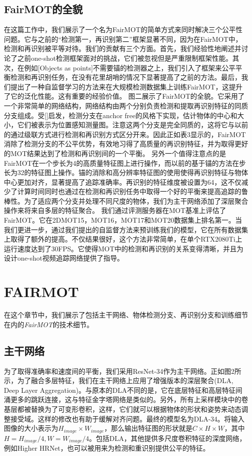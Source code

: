 \documentclass{ctexart}
\begin{document}
\subsection{FairMOT的全貌}
在这篇工作中，我们展示了一个名为FairMOT的简单方式来同时解决三个公平性问题。它与之前的“检测第一，再识别第二”框架显著不同，因为在FairMOT中，检测和再识别被平等对待。我们的贡献有三个方面。首先，我们经验性地阐述并讨论了之前one-shot检测框架面对的挑战，它们被忽视但是严重限制框架性能。其次，在例如[Objects as points]不需要锚的检测器之上，我们引入了框架来公平平衡检测和再识别任务，在没有花里胡哨的情况下显著提高了之前的方法。最后，我们提出了一种自监督学习的方法来在大规模检测数据集上训练FairMOT，这提升了它的泛化性能。这有重要的经验价值。\newline
图二展示了FairMOT的全貌。它采用了一个非常简单的网络结构，网络结构由两个分别负责检测和提取再识别特征的同质分支组成。受[]启发，检测分支在anchor free的风格下实现，估计物体的中心和大小，它们被表示为位置感知测量图。注意这两个分支是完全同质的，这将它与以前的通过级联方式进行检测和再识别方式区分开来。因此正如表3显示的，FairMOT消除了检测分支的不公平优势，有效地习得了高质量的再识别特征，并为取得更好的MOT结果达到了检测和再识别间的一个平衡。\newline
另外一个值得注意点的是FairMOT在一个步长为4的高质量特征图上进行操作，而以前的基于锚的方法在步长为32的特征图上操作。锚的消除和高分辨率特征图的使用使得再识别特征与物体中心更加对齐，显著提高了追踪准确率。再识别的特征维度被设置为64，这不仅减少了计算时间同时也通过在检测和再识别任务中取得一个好的平衡来提高追踪的鲁棒性。为了适应两个分支并处理不同尺度的物体，我们为主干网络添加了深层聚合操作来将来自多层的特征聚合。\newline
我们通过评测服务器在MOT基准上评估了FairMOT。它在2DMOT15，MOT16，MOT17和MOT20数据集上排名第一。当我们更进一步，通过我们提出的自监督方法来预训练我们的模型，它在所有数据集上取得了额外的提高。不仅结果很好，这个方法非常简单，在单个RTX2080Ti上运行速度达到了30FPS。它使得MOT中的检测和再识别的关系变得清晰，并且为设计one-shot视频追踪网络提供了指导。
\section{FAIRMOT}
在这个章节中，我们展示了包括主干网络、物体检测分支、再识别分支和训练细节在内的\textit{FairMOT}的技术细节。
\subsection{主干网络}为了取得准确率和速度间的平衡，我们采用ResNet-34作为主干网络。正如图2所示，为了融合多层特征，我们在主干网络上应用了增强版本的深层聚合(DLA, Deep Layer Aggregation)。与原本的DLA不同的是，它在底层特征和高层特征间涌更多的跳跃连接，这与特征金字塔网络是类似的。另外，所有上采样模块中的卷基层都被替换为了可变形卷积，这样，它们就可以根据物体的形状和姿势来动态调整接受域。这样的修改也有助于缓解对齐问题。最终的模型名为DLA-34。将输入图像的大小表示为$H_{image}\times W_{image}$，那么输出特征图的形状就是$C\times H \times W$，其中$H=H_{image}/4, W=W_{image}/4$。包括DLA，其他提供多尺度卷积特征的深度网络，例如Higher HRNet，也可以被用来为检测和重识别提供公平的特征。
\end{document}
